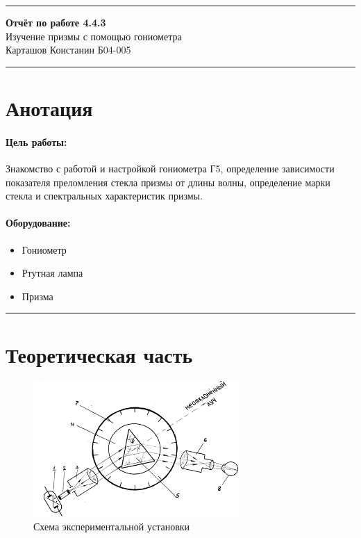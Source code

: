 \documentclass[a4paper,12pt]{article} %
\begin{document}


\hrule 	
\medskip
\begin{raggedright}
{\large \textbf{Отчёт по работе 4.4.3}}
\\
\medskip
{\Large Изучение призмы с помощью гониометра} 
\\
\medskip
{\large Карташов Констанин Б04-005}
\medskip
\hrule
\medskip
\end{raggedright}


\section{Анотация}

\paragraph{Цель работы:} 
Знакомство с работой и настройкой гониометра Г5, определение зависимости показателя преломления стекла призмы от длины волны, определение марки стекла и спектральных характеристик призмы.

\paragraph{Оборудование:}
\begin{itemize}
\renewcommand{\labelitemi}{$\triangleright$}
\itemsep0em
\item Гониометр
\item Ртутная лампа
\item Призма
\end{itemize}


\medskip\hrule\medskip

\section{Теоретическая часть}

\begin{figure}[h]
\center
\includegraphics[width=0.7\textwidth]{gon.png}
\caption{Схема экспериментальной установки}
\label{fig:setup}
\end{figure}
\end{document}
